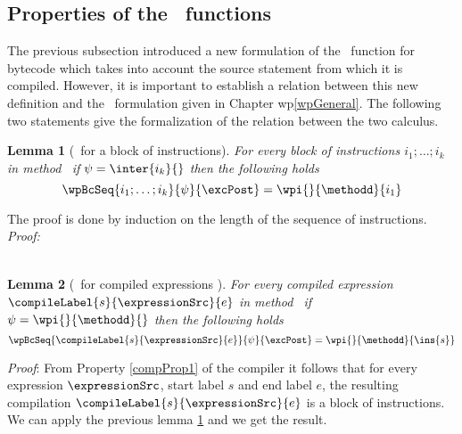 \newtheorem{wpBlock}{Lemma}[subsection]
\newtheorem{relWpExpr}[wpBlock]{Lemma}
\newtheorem{relWpStmt}[wpBlock]{Lemma}

\subsection{Properties of the \wpName \ functions}
    The previous subsection introduced a new formulation of the 
    \wpName \ function for bytecode which takes into account 
    the source statement from which it is compiled. 
    However, it is important to establish a relation between this new definition
    and  the \wpName \ formulation given in  Chapter wp\ref{wpGeneral}.
    The following two statements give the formalization of the relation between 
    the two calculus.



\begin{wpBlock}[\wpName  \  for a block of instructions]\label{wpBlock}
  For every block of instructions $i_1; \dots;i_k $    in  method \methodd  \
  if $\psi = \inter{i_k}{\next{i_k}}$ then the following holds
     $$   \wpBcSeq{i_1; \dots;i_k }{\psi }{\excPost} = \wpi{}{\methodd}{i_1}$$        
\end{wpBlock} 

The proof is done by induction on the length of the sequence of instructions.
\textit{Proof:}

$$
\begin{array}{l}
\end{array}
$$

\begin{relWpExpr}[\wpName  \  for compiled expressions ]\label{relWpExpr}
     For every compiled expression $\compileLabel{s}{\expressionSrc}{e}$  in  method \methodd  \
     if $\psi = \wpi{  }{\methodd }{ \next{\ins{e} } }$ then the following holds
     $$   \wpBcSeq{\compileLabel{s}{\expressionSrc}{e}   }{\psi }{\excPost} = \wpi{}{\methodd}{\ins{s}}$$        

\end{relWpExpr}

\textit{Proof}: From Property \ref{compProp1} of the compiler it follows that for every expression
 $\expressionSrc$, start label $s$  and  end label $e$,
  the resulting compilation   $\compileLabel{s}{\expressionSrc}{e}$ is a block of instructions. We can apply 
 the previous lemma  \ref{wpBlock} and we get the result.
